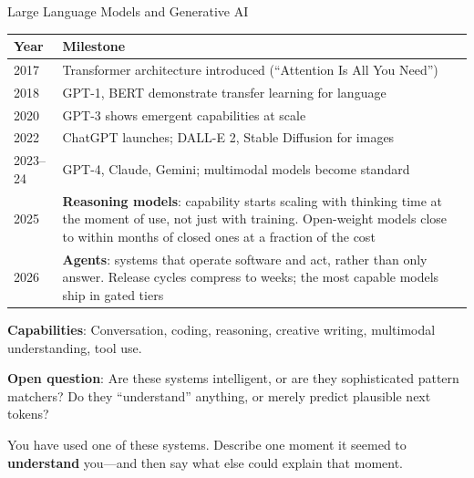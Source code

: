 ﻿\documentclass[aspectratio=169,11pt]{beamer}
\begin{document}
\begin{frame}{Large Language Models and Generative AI}
\begin{table}[h]
\centering
\scriptsize
\begin{tabular}{@{}ll@{}}
\toprule
\textbf{Year} & \textbf{Milestone} \\
\midrule
2017 & Transformer architecture introduced (``Attention Is All You Need'') \\
2018 & GPT-1, BERT demonstrate transfer learning for language \\
2020 & GPT-3 shows emergent capabilities at scale \\
2022 & ChatGPT launches; DALL-E 2, Stable Diffusion for images \\
2023--24 & GPT-4, Claude, Gemini; multimodal models become standard \\
2025 & \textbf{Reasoning models}: capability starts scaling with thinking time at the moment of use, not just with training. Open-weight models close to within months of closed ones at a fraction of the cost \\
2026 & \textbf{Agents}: systems that operate software and act, rather than only answer. Release cycles compress to weeks; the most capable models ship in gated tiers \\
\bottomrule
\end{tabular}
\end{table}

\vspace{0.2em}
\textbf{Capabilities}: Conversation, coding, reasoning, creative writing, multimodal understanding, tool use.

\vspace{0.2em}
\textbf{Open question}: Are these systems intelligent, or are they sophisticated pattern matchers? Do they ``understand'' anything, or merely predict plausible next tokens?

\begin{discussionbox}[Discussion]
You have used one of these systems. Describe one moment it seemed to \textbf{understand} you---and then say what else could explain that moment.
\end{discussionbox}
\end{frame}
\end{document}
